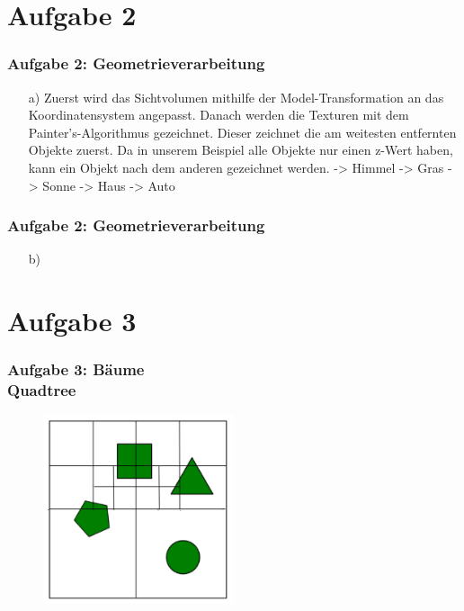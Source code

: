 \documentclass[accentcolor=tud9c,colorbacktitle,inverttitle,landscape,german,presentation,t]{tudbeamer}
\begin{document}
\section{Aufgabe 2}
	\begin{frame}
		\frametitle{Aufgabe 2: Geometrieverarbeitung}
		\begin{itemize}
		\item[a)] Zuerst wird das Sichtvolumen mithilfe der Model-Transformation an das Koordinatensystem angepasst. Danach werden die Texturen mit dem Painter's-Algorithmus gezeichnet. Dieser zeichnet die am weitesten entfernten Objekte zuerst. Da in unserem Beispiel alle Objekte nur einen z-Wert haben, kann ein Objekt nach dem anderen gezeichnet werden. -> Himmel -> Gras -> Sonne -> Haus -> Auto
		\end{itemize}
	\end{frame}
	\begin{frame}
	\frametitle{Aufgabe 2: Geometrieverarbeitung} %
	\begin{itemize}

		\item[b)]
	\end{itemize}
\end{frame}
	
\section{Aufgabe 3}
\begin{frame}
	\frametitle{Aufgabe 3: B\"aume \\Quadtree} 
	\begin{figure}
		\centering
		\includegraphics[width=0.5\textwidth]{Quadtree}
	\end{figure}
\end{frame}
\end{document}
